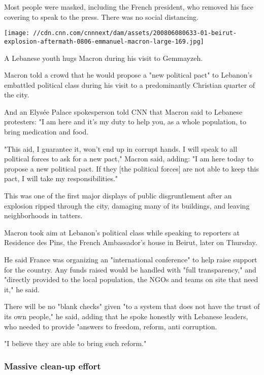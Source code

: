 Most people were masked, including the French president, who removed his
face covering to speak to the press. There was no social distancing.

\texttt{[image: //cdn.cnn.com/cnnnext/dam/assets/200806080633-01-beirut-explosion-aftermath-0806-emmanuel-macron-large-169.jpg]}

A Lebanese youth hugs Macron during his visit to Gemmayzeh.

Macron told a crowd that he would propose a "new political pact" to
Lebanon's embattled political class during his visit to a predominantly
Christian quarter of the city.

And an Elysée Palace spokesperson told CNN that Macron said to Lebanese
protesters: "I am here and it's my duty to help you, as a whole
population, to bring medication and food.

"This aid, I guarantee it, won't end up in corrupt hands. I will speak
to all political forces to ask for a new pact," Macron said, adding: "I
am here today to propose a new political pact. If they {[}the political
forces{]} are not able to keep this pact, I will take my
responsibilities."

This was one of the first major displays of public disgruntlement after
an explosion ripped through the city, damaging many of its buildings,
and leaving neighborhoods in tatters.

Macron took aim at Lebanon's political class while speaking to reporters
at Residence des Pins, the French Ambassador's house in Beirut, later on
Thursday.

He said France was organizing an "international conference" to help
raise support for the country. Any funds raised would be handled with
"full transparency," and "directly provided to the local population, the
NGOs and teams on site that need it," he said.

There will be no "blank checks" given "to a system that does not have
the trust of its own people," he said, adding that he spoke honestly
with Lebanese leaders, who needed to provide "answers to freedom,
reform, anti corruption.

"I believe they are able to bring such reform."

\hypertarget{massive-clean-up-effort}{%
\subsubsection{Massive clean-up effort}\label{massive-clean-up-effort}}

